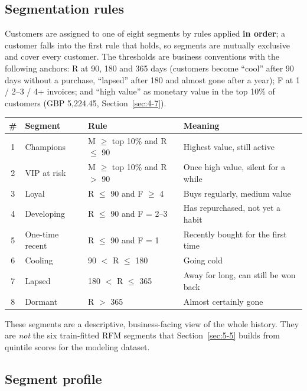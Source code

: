\subsection{Segmentation rules}

Customers are assigned to one of eight segments by rules applied \textbf{in order}; a customer falls into the first rule that holds, so segments are mutually exclusive and cover every customer. The thresholds are business conventions with the following anchors: R at 90, 180 and 365 days (customers become ``cool'' after 90 days without a purchase, ``lapsed'' after 180 and almost gone after a year); F at 1 / 2--3 / 4+ invoices; and ``high value'' as monetary value in the top 10\% of customers (GBP 5,224.45, Section~\ref{sec:4-7}).

\begin{center}
\small
\begin{tabular}{@{}clp{4.6cm}p{5.4cm}@{}}
    \toprule
    \# & Segment & Rule & Meaning \\
    \midrule
    1 & Champions & M $\ge$ top 10\% and R $\le$ 90 & Highest value, still active \\
    2 & VIP at risk & M $\ge$ top 10\% and R $>$ 90 & Once high value, silent for a while \\
    3 & Loyal & R $\le$ 90 and F $\ge$ 4 & Buys regularly, medium value \\
    4 & Developing & R $\le$ 90 and F = 2--3 & Has repurchased, not yet a habit \\
    5 & One-time recent & R $\le$ 90 and F = 1 & Recently bought for the first time \\
    6 & Cooling & 90 $<$ R $\le$ 180 & Going cold \\
    7 & Lapsed & 180 $<$ R $\le$ 365 & Away for long, can still be won back \\
    8 & Dormant & R $>$ 365 & Almost certainly gone \\
    \bottomrule
\end{tabular}
\end{center}

These segments are a descriptive, business-facing view of the whole history. They are \emph{not} the six train-fitted RFM segments that Section~\ref{sec:5-5} builds from quintile scores for the modeling dataset.

\subsection{Segment profile}

